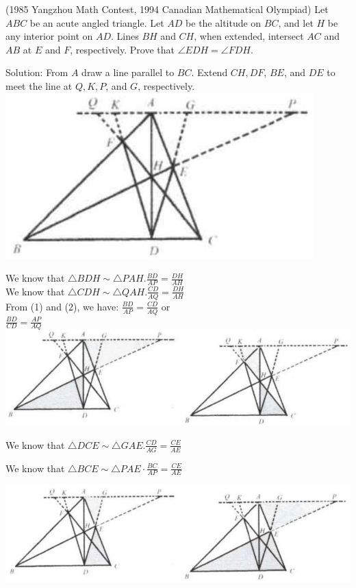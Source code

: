 \documentclass{article}
\begin{document}
(1985 Yangzhou Math Contest, 1994 Canadian Mathematical Olympiad) Let \(A B C\) be an acute angled triangle. Let \(A D\) be the altitude on \(B C\), and let \(H\) be any interior point on \(A D\). Lines \(B H\) and \(C H\), when extended, intersect \(A C\) and \(A B\) at \(E\) and \(F\), respectively. Prove that \(\angle E D H=\angle F D H\).

Solution:
From \(A\) draw a line parallel to \(B C\). Extend \(C H, D F\), \(B E\), and \(D E\) to meet the line at \(Q, K, P\), and \(G\), respectively.\\
\centering
\includegraphics[width=\textwidth]{images/124(1).jpg}

We know that \(\triangle B D H \sim \triangle P A H . \frac{B D}{A P}=\frac{D H}{A H}\)\\
We know that \(\triangle C D H \sim \triangle Q A H . \frac{C D}{A Q}=\frac{D H}{A H}\)\\
From (1) and (2), we have: \(\frac{B D}{A P}=\frac{C D}{A Q}\) or\\
\(\frac{B D}{C D}=\frac{A P}{A Q}\)\\
\centering
\includegraphics[width=\textwidth]{images/124(3).jpg}

We know that \(\triangle D C E \sim \triangle G A E . \frac{C D}{A G}=\frac{C E}{A E}\)

We know that \(\triangle B C E \sim \triangle P A E \cdot \frac{B C}{A P}=\frac{C E}{A E}\)


\begin{center}
\includegraphics[width=\textwidth]{images/125(1).jpg}
\end{center}
\end{document}
